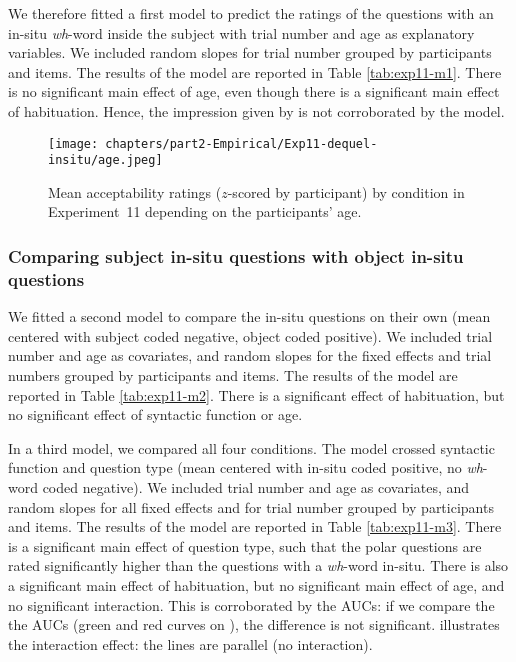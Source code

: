 We therefore fitted a first model to predict the ratings of the questions with an in-situ \emph{wh}-word inside the subject with trial number and age as explanatory variables. We included random slopes for trial number grouped by participants and items. The results of the model are reported in Table \ref{tab:exp11-m1}. There is no significant main effect of age, even though there is a significant main effect of habituation. Hence, the impression given by  is not corroborated by the model.

\begin{figure}
    \centering
    \texttt{[image: chapters/part2-Empirical/Exp11-dequel-insitu/age.jpeg]}
    \caption{Mean acceptability ratings ($z$-scored by participant) by condition in  Experiment~11 depending on the participants' age.}
    \label{fig:exp11-age}
\end{figure}



\subsubsection{Comparing subject in-situ questions with object in-situ questions}

We fitted a second model to compare the in-situ questions on their own (mean centered with subject coded negative, object coded positive). We included trial number and age as covariates, and random slopes for the fixed effects and trial numbers grouped by participants and items. The results of the model are reported in Table \ref{tab:exp11-m2}. 
There is a significant effect of habituation, but no significant effect of syntactic function or age.



In a third model, we compared all four conditions. The model crossed syntactic function and question type (mean centered with in-situ coded positive, no \emph{wh}-word coded negative). We included trial number and age as covariates, and random slopes for all fixed effects and for trial number grouped by participants and items. The results of the model are reported in Table \ref{tab:exp11-m3}. 
There is a significant main effect of question type, such that the polar questions are rated significantly higher than the questions with a \emph{wh}-word in-situ. There is also a significant main effect of habituation, but no significant main effect of age, and no significant interaction. This is corroborated by the AUCs: if we compare the the AUCs (green and red curves on ), the difference is not significant.  illustrates the interaction effect: the lines are parallel (no interaction).  

